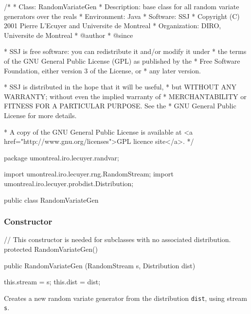 \begin{code}
\begin{hide}
/*
 * Class:        RandomVariateGen
 * Description:  base class for all random variate generators over the reals 
 * Environment:  Java
 * Software:     SSJ 
 * Copyright (C) 2001  Pierre L'Ecuyer and Universite de Montreal
 * Organization: DIRO, Universite de Montreal
 * @author       
 * @since

 * SSJ is free software: you can redistribute it and/or modify it under
 * the terms of the GNU General Public License (GPL) as published by the
 * Free Software Foundation, either version 3 of the License, or
 * any later version.

 * SSJ is distributed in the hope that it will be useful,
 * but WITHOUT ANY WARRANTY; without even the implied warranty of
 * MERCHANTABILITY or FITNESS FOR A PARTICULAR PURPOSE.  See the
 * GNU General Public License for more details.

 * A copy of the GNU General Public License is available at
   <a href="http://www.gnu.org/licenses">GPL licence site</a>.
 */
\end{hide}
package umontreal.iro.lecuyer.randvar;\begin{hide}
import umontreal.iro.lecuyer.rng.RandomStream;
import umontreal.iro.lecuyer.probdist.Distribution;\end{hide}

public class RandomVariateGen \begin{hide} {

   protected RandomStream stream;
   // the stream used for generating random variates

   protected Distribution dist;
   // the distribution used by this generator

\end{hide}
\end{code}

\subsubsection* {Constructor}
\begin{code}\begin{hide}
 // This constructor is needed for subclasses with no associated distribution.
   protected RandomVariateGen() {}\end{hide}

   public RandomVariateGen (RandomStream s, Distribution dist) \begin{hide} {
      this.stream = s;
      this.dist   = dist;
   }\end{hide}
\end{code}
  \begin{tabb}  Creates a new random variate generator from the
    distribution \texttt{dist}, using stream \texttt{s}.
 \end{tabb}
\begin{htmlonly}
\end{htmlonly}

